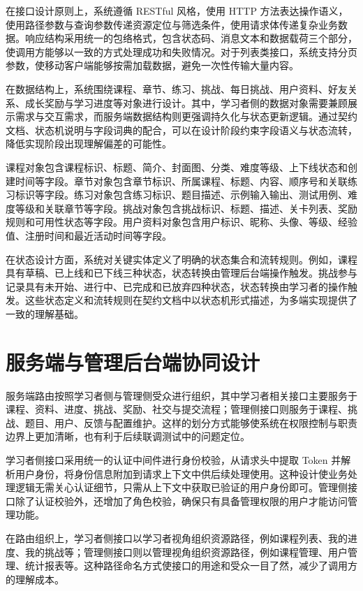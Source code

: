 在接口设计原则上，系统遵循 RESTful 风格，使用 HTTP 方法表达操作语义，使用路径参数与查询参数传递资源定位与筛选条件，使用请求体传递复杂业务数据。响应结构采用统一的包络格式，包含状态码、消息文本和数据载荷三个部分，使调用方能够以一致的方式处理成功和失败情况。对于列表类接口，系统支持分页参数，使移动客户端能够按需加载数据，避免一次性传输大量内容。

在数据结构上，系统围绕课程、章节、练习、挑战、每日挑战、用户资料、好友关系、成长奖励与学习进度等对象进行设计。其中，学习者侧的数据对象需要兼顾展示需求与交互需求，而服务端数据结构则更强调持久化与状态更新逻辑。通过契约文档、状态机说明与字段词典的配合，可以在设计阶段约束字段语义与状态流转，降低实现阶段出现理解偏差的可能性。

课程对象包含课程标识、标题、简介、封面图、分类、难度等级、上下线状态和创建时间等字段。章节对象包含章节标识、所属课程、标题、内容、顺序号和关联练习标识等字段。练习对象包含练习标识、题目描述、示例输入输出、测试用例、难度等级和关联章节等字段。挑战对象包含挑战标识、标题、描述、关卡列表、奖励规则和可用性状态等字段。用户资料对象包含用户标识、昵称、头像、等级、经验值、注册时间和最近活动时间等字段。

在状态设计方面，系统对关键实体定义了明确的状态集合和流转规则。例如，课程具有草稿、已上线和已下线三种状态，状态转换由管理后台端操作触发。挑战参与记录具有未开始、进行中、已完成和已放弃四种状态，状态转换由学习者的操作触发。这些状态定义和流转规则在契约文档中以状态机形式描述，为多端实现提供了一致的理解基础。

\section{服务端与管理后台端协同设计}

服务端路由按照学习者侧与管理侧受众进行组织，其中学习者相关接口主要服务于课程、资料、进度、挑战、奖励、社交与提交流程；管理侧接口则服务于课程、挑战、题目、用户、反馈与配置维护。这样的划分方式能够使系统在权限控制与职责边界上更加清晰，也有利于后续联调测试中的问题定位。

学习者侧接口采用统一的认证中间件进行身份校验，从请求头中提取 Token 并解析用户身份，将身份信息附加到请求上下文中供后续处理使用。这种设计使业务处理逻辑无需关心认证细节，只需从上下文中获取已验证的用户身份即可。管理侧接口除了认证校验外，还增加了角色校验，确保只有具备管理权限的用户才能访问管理功能。

在路由组织上，学习者侧接口以学习者视角组织资源路径，例如课程列表、我的进度、我的挑战等；管理侧接口则以管理视角组织资源路径，例如课程管理、用户管理、统计报表等。这种路径命名方式使接口的用途和受众一目了然，减少了调用方的理解成本。

